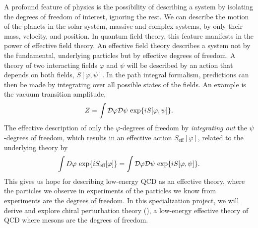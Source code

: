 A profound feature of physics is the possibility of describing a system by isolating the degrees of freedom of interest, ignoring the rest.
We can describe the motion of the planets in the solar system, massive and complex systems, by only their mass, velocity, and position.
In quantum field theory, this feature manifests in the power of effective field theory.
An effective field theory describes a system not by the fundamental, underlying particles but by effective degrees of freedom.
A theory of two interacting fields $\varphi$ and $\psi$ will be described by an action that depends on both fields, $S[\varphi, \psi]$.
In the path integral formalism, predictions can then be made by integrating over all possible states of the fields.
An example is the vacuum transition amplitude,
\begin{equation}
    Z = \int \mathcal{D} \varphi \mathcal{D} \psi \, \exp{i S[\varphi, \psi]}.
\end{equation}
The effective description of only the $\varphi$-degrees of freedom by \emph{integrating out} the $\psi$-degrees of freedom, which results in an effective action $S_\text{eff}[\varphi]$, related to the underlying theory by~\cite{Schwartz:QFT}
\begin{equation}
    \label{integrating out degrees of freedom}
    \int D \varphi \, \exp{i S_\text{eff}[\varphi]}
    =
    \int \mathcal{D} \varphi \mathcal{D} \psi \, \exp{i S[\varphi, \psi]}.
\end{equation}
This gives us hope for describing low-energy QCD as an effective theory, where the particles we observe in experiments of the particles we know from experiments are the degrees of freedom.
In this specialization project, we will derive and explore chiral perturbation theory (\chpt), a low-energy effective theory of QCD where mesons are the degrees of  freedom.

